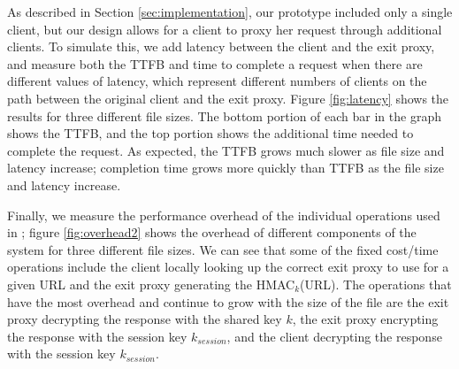 

As described in Section \ref{sec:implementation}, our prototype included only a single client, but 
our design allows for a client to proxy her request through additional clients.  To simulate this, we 
add latency between the client and the exit proxy, and measure both the TTFB and time to complete a request 
when there are different values of latency, which represent different numbers of clients on the path between the 
original client and the exit proxy.  Figure \ref{fig:latency} shows the results for three different file sizes. The 
bottom portion of each bar in the graph shows the TTFB, and the top portion shows the additional time needed 
to complete the request.  As expected, the TTFB grows much slower as file size and latency increase; completion time 
grows more quickly than TTFB as the file size and latency increase.   


Finally, we measure the performance overhead of the individual operations used in
\system{}; figure \ref{fig:overhead2} shows
the overhead of different components of the system for three different file sizes.  We can see that some of the fixed cost/time 
operations include the client locally looking up the correct exit proxy to use for a given URL and the exit proxy generating the 
HMAC$_{k}$(URL).  The operations that have the most overhead and continue to grow with the size of the file are the exit proxy decrypting 
the response with the shared key $k$, the exit proxy encrypting the response with the session key $k_{session}$, and the client 
decrypting the response with the session key $k_{session}$.

